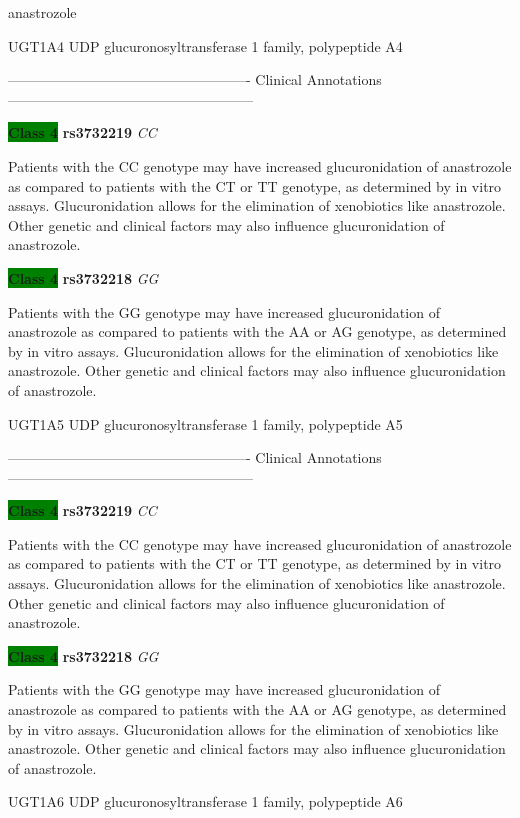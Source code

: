 \documentclass{resume} %
\begin{document}
\begin{rSection}{ anastrozole }
\begin{rSubsection}{ UGT1A4 }{ UDP glucuronosyltransferase 1 family, polypeptide A4 }{}{}
\item[] ---------------------------------------------------- Clinical Annotations -----------------------------------------------------\newline
\item \textbf{\colorbox{green} {Class 4}} \textbf{ rs3732219 } \textit{ CC }
\item[] Patients with the CC genotype may have increased glucuronidation of anastrozole as compared to patients with the CT or TT genotype, as determined by in vitro assays. Glucuronidation allows for the elimination of xenobiotics like anastrozole. Other genetic and clinical factors may also influence glucuronidation of anastrozole. \item \textbf{\colorbox{green} {Class 4}} \textbf{ rs3732218 } \textit{ GG }
\item[] Patients with the GG genotype may have increased glucuronidation of anastrozole as compared to patients with the AA or AG genotype, as determined by in vitro assays. Glucuronidation allows for the elimination of xenobiotics like anastrozole. Other genetic and clinical factors may also influence glucuronidation of anastrozole.
\end{rSubsection}\begin{rSubsection}{ UGT1A5 }{ UDP glucuronosyltransferase 1 family, polypeptide A5 }{}{}
\item[]

\item[] ---------------------------------------------------- Clinical Annotations -----------------------------------------------------\newline
\item \textbf{\colorbox{green} {Class 4}} \textbf{ rs3732219 } \textit{ CC }
\item[] Patients with the CC genotype may have increased glucuronidation of anastrozole as compared to patients with the CT or TT genotype, as determined by in vitro assays. Glucuronidation allows for the elimination of xenobiotics like anastrozole. Other genetic and clinical factors may also influence glucuronidation of anastrozole. \item \textbf{\colorbox{green} {Class 4}} \textbf{ rs3732218 } \textit{ GG }
\item[] Patients with the GG genotype may have increased glucuronidation of anastrozole as compared to patients with the AA or AG genotype, as determined by in vitro assays. Glucuronidation allows for the elimination of xenobiotics like anastrozole. Other genetic and clinical factors may also influence glucuronidation of anastrozole.
\end{rSubsection}\begin{rSubsection}{ UGT1A6 }{ UDP glucuronosyltransferase 1 family, polypeptide A6 }{}{}
\item[]


\end{rSubsection}
\end{rSection}
\end{document}
